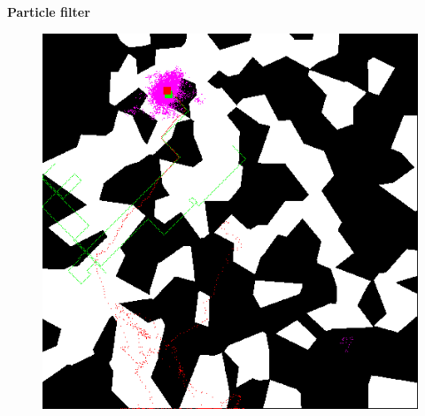 \documentclass[xcolor=dvipsnames]{beamer}
\begin{document}
\begin{frame}{\bf Particle filter}

\begin{figure}[htbp]
  \centering
   \includegraphics[scale=0.4]{../pictures/00700.png}
\end{figure}

\end{frame}
\end{document}
